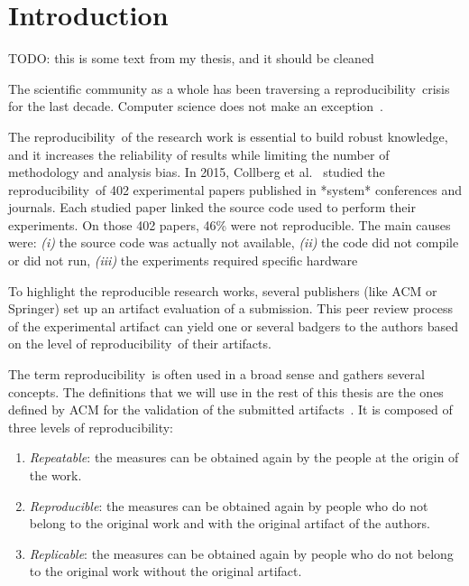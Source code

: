 \documentclass[sigconf,natbib=false]{acmart}
\newcommand{\repro}{reproducibility}
\newcommand{\todo}[1]{{\color{red}TODO: #1}}
\begin{document}
\maketitle


\section{Introduction}

\todo{this is some text from my thesis, and it should be cleaned}

The scientific community as a whole has been traversing a \repro\ crisis for the last decade.
Computer science does not make an exception\ \cite{randallIrreproducibilityCrisisModern2018,baker500ScientistsLift2016}.

The \repro\ of the research work is essential to build robust knowledge, and it increases the reliability of results while limiting the number of methodology and analysis bias.
In 2015, Collberg et al.\ \cite{collberg_repeatability_2015} studied the \repro\ of 402 experimental papers published in *system* conferences and journals.
Each studied paper linked the source code used to perform their experiments. 
On those 402 papers, 46\% were not reproducible.
The main causes were:
\emph{(i)} the source code was actually not available,
\emph{(ii)} the code did not compile or did not run,
\emph{(iii)} the experiments required specific hardware

To highlight the reproducible research works, several publishers (like ACM or Springer) set up an artifact evaluation of a submission.
This peer review process of the experimental artifact can yield one or several badgers to the authors based on the level of \repro\ of their artifacts.

The term \repro\ is often used in a broad sense and gathers several concepts.
The definitions that we will use in the rest of this thesis are the ones defined by ACM for the validation of the submitted artifacts\ \cite{acm-badges}.
It is composed of three levels of \repro:

\begin{enumerate}
\item \emph{Repeatable}: the measures can be obtained again by the people at the origin of the work.
\item \emph{Reproducible}: the measures can be obtained again by people who do not belong to the original work and with the original artifact of the authors.
\item \emph{Replicable}: the measures can be obtained again by people who do not belong to the original work without the original artifact.
\end{enumerate}
\end{document}
